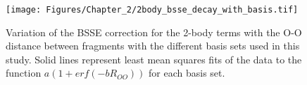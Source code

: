 \begin{figure}[h]
\begin{center}
\texttt{[image: Figures/Chapter\_2/2body\_bsse\_decay\_with\_basis.tif]}
\end{center}
\caption[Variation of the BSSE correction for the 2-body terms with the O-O distance between fragments with the different basis sets used in this study. Solid lines represent least mean squares fits of the data to the function $a(1+erf(-bR_{OO}))$ for each basis set.]{Variation of the BSSE correction for the 2-body terms with the O-O distance between fragments with the different basis sets used in this study. Solid lines represent least mean squares fits of the data to the function $a(1+erf(-bR_{OO}))$ for each basis set.}
\label{fig:MBE_I_F9}
\end{figure}
